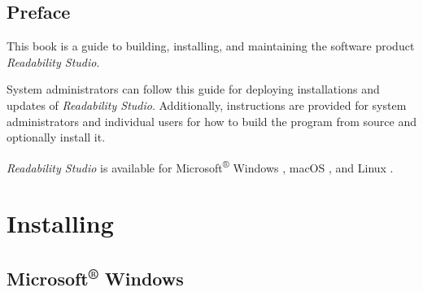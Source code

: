 \documentclass[
  letterpaper,
]{LegrandOrangeBook}
\renewcommand*\contentsname{Table of contents}
\newcommand\contentsname{Table of contents}
\begin{document}

\clearpage{\thispagestyle{empty}\cleardoublepage}
\restoregeometry 

\frontmatter



\clearpage




\clearpage

\pagestyle{fancy}

\renewcommand*\contentsname{Table of contents}
{
\hypersetup{linkcolor=}
\setcounter{tocdepth}{1}
\tableofcontents
}

\mainmatter


\chapter*{Preface}\label{sec-preface}


This book is a guide to building, installing, and maintaining the
software product \emph{Readability Studio}.

System administrators can follow this guide for deploying installations
and updates of \emph{Readability Studio}. Additionally, instructions are
provided for system administrators and individual users for how to build
the program from source and optionally install it.

\emph{Readability Studio} is available for Microsoft\textsuperscript{®}
Windows \faWindows, macOS \faApple, and Linux \faLinux.

\part{Installing}

\chapter{\texorpdfstring{Microsoft\textsuperscript{®} Windows
\faWindows }{Microsoft® Windows }}\label{microsoft-windows}
\end{document}
